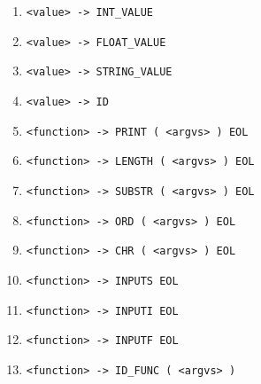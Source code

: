 \documentclass [11pt, a4paper]{article}
\begin{document}
\begin{table}[!ht]
\begin{enumerate}[noitemsep]
        \item \verb|<value> -> INT_VALUE|
        \item \verb|<value> -> FLOAT_VALUE|
        \item \verb|<value> -> STRING_VALUE|
        \item \verb|<value> -> ID|
       
        \item \verb|<function> -> PRINT ( <argvs> ) EOL|
        \item \verb|<function> -> LENGTH ( <argvs> ) EOL|
        \item \verb|<function> -> SUBSTR ( <argvs> ) EOL|
        \item \verb|<function> -> ORD ( <argvs> ) EOL|
        \item \verb|<function> -> CHR ( <argvs> ) EOL|
        \item \verb|<function> -> INPUTS EOL|
        \item \verb|<function> -> INPUTI EOL|
        \item \verb|<function> -> INPUTF EOL|
        \item \verb|<function> -> ID_FUNC ( <argvs> )|
	\end{enumerate}

	\label{table:ll_gramatika}
\end{table}
\end{document}
